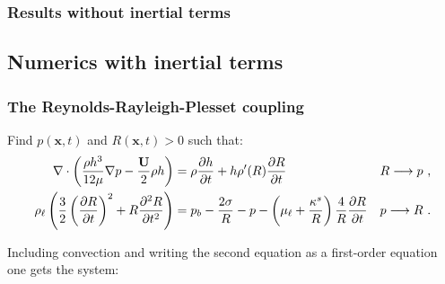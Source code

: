 \documentclass[10pt,aspectratio=169]{beamer}
\begin{document}
\begin{frame}\frametitle{Results without inertial terms}\vspace*{0.5cm}
\begin{center}
	\begin{minipage}{0.9\textwidth}
		\centering 
	\end{minipage}
\end{center}

\end{frame}

\subsection{Numerics with inertial terms}
\setcounter{showSlideNumbers}{0}
\begin{frame}[noframenumbering]
\tableofcontents[
currentsection,
currentsubsection,
subsectionstyle=show/shaded/hide
]
\end{frame}
\setcounter{showSlideNumbers}{1}

\begin{frame}
\frametitle{The Reynolds-Rayleigh-Plesset coupling}

Find $p(\mathbf{x},t)$ and $R(\mathbf{x},t)>0$ such that:
\begin{align*}
\nabla\cdot\left(\frac{\rho h^3}{12\mu }\nabla p-\frac{\mathbf{U}}{2}\rho h \right)&=\rho \frac{\partial h}{\partial t}+h \rho'(R)\frac{\partial R}{\partial t}&&R \longrightarrow p~,\\
\rho_\ell\left(\frac{3}{2}\left(\frac{\partial R}{\partial t}\right)^2+R\frac{\partial^2 R}{\partial t^2}\right)&=p_b-\frac{2\sigma}{R}-p-\left(\mu_\ell+\frac{\kappa^s}{R}\right)\frac{4}{R}\frac{\partial R}{\partial t}&&p\longrightarrow R~.
\end{align*}

Including convection and writing the second equation as a first-order equation one gets the system:
\end{frame}  
\end{document}
